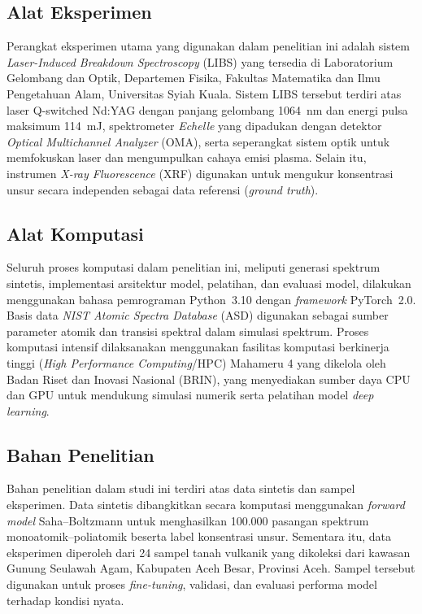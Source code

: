 \subsection{Alat Eksperimen}

Perangkat eksperimen utama yang digunakan dalam penelitian ini adalah sistem \textit{Laser-Induced Breakdown Spectroscopy} (LIBS) yang tersedia di Laboratorium Gelombang dan Optik, Departemen Fisika, Fakultas Matematika dan Ilmu Pengetahuan Alam, Universitas Syiah Kuala. Sistem LIBS tersebut terdiri atas laser Q-switched Nd:YAG dengan panjang gelombang 1064~nm dan energi pulsa maksimum 114~mJ, spektrometer \textit{Echelle} yang dipadukan dengan detektor \textit{Optical Multichannel Analyzer} (OMA), serta seperangkat sistem optik untuk memfokuskan laser dan mengumpulkan cahaya emisi plasma. Selain itu, instrumen \textit{X-ray Fluorescence} (XRF) digunakan untuk mengukur konsentrasi unsur secara independen sebagai data referensi (\textit{ground truth}).

\subsection{Alat Komputasi}

Seluruh proses komputasi dalam penelitian ini, meliputi generasi spektrum sintetis, implementasi arsitektur model, pelatihan, dan evaluasi model, dilakukan menggunakan bahasa pemrograman Python~3.10 dengan \textit{framework} PyTorch~2.0. Basis data \textit{NIST Atomic Spectra Database} (ASD) \citep{kramida_nist_2024} digunakan sebagai sumber parameter atomik dan transisi spektral dalam simulasi spektrum. Proses komputasi intensif dilaksanakan menggunakan fasilitas komputasi berkinerja tinggi (\textit{High Performance Computing}/HPC) Mahameru 4 yang dikelola oleh Badan Riset dan Inovasi Nasional (BRIN), yang menyediakan sumber daya CPU dan GPU untuk mendukung simulasi numerik serta pelatihan model \textit{deep learning}.

\subsection{Bahan Penelitian}

Bahan penelitian dalam studi ini terdiri atas data sintetis dan sampel eksperimen. Data sintetis dibangkitkan secara komputasi menggunakan \textit{forward model} Saha--Boltzmann untuk menghasilkan 100.000 pasangan spektrum monoatomik--poliatomik beserta label konsentrasi unsur. Sementara itu, data eksperimen diperoleh dari 24 sampel tanah vulkanik yang dikoleksi dari kawasan Gunung Seulawah Agam, Kabupaten Aceh Besar, Provinsi Aceh. Sampel tersebut digunakan untuk proses \textit{fine-tuning}, validasi, dan evaluasi performa model terhadap kondisi nyata.



